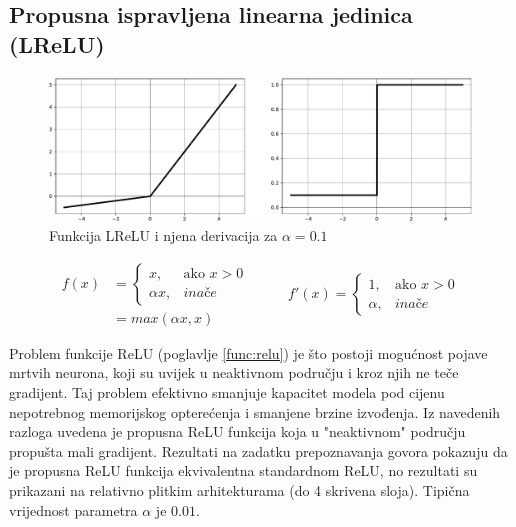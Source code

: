 \documentclass[times, utf8, numeric, diplomski]{fer}
\def\otherwise{\textit{inače}}
\def\secref#1{(poglavlje \ref{#1})}
\begin{document}
\subsection{Propusna ispravljena linearna jedinica (LReLU)}

\begin{figure}[H]
\includegraphics[width=\textwidth]{func_LReLU.pdf}
\centering
\caption{Funkcija LReLU i njena derivacija za $\alpha=0.1$}
\label{fig:lrelu}
\end{figure}

\begin{equation}
\label{eq:lrelu}
\begin{split}
f(x) &= \begin{cases}
x,			& \text{ako } x > 0 \\
\alpha x,	& \otherwise
\end{cases} \\
&= max(\alpha x, x)
\end{split}
\qquad
\begin{split}
f'(x) = 
\begin{cases}
1,		& \text{ako } x > 0 \\
\alpha,	& \otherwise
\end{cases}
\end{split}
\end{equation}

Problem funkcije ReLU \secref{func:relu} je što postoji mogućnost pojave mrtvih neurona, koji su uvijek u neaktivnom području i kroz njih ne teče gradijent. Taj problem efektivno smanjuje kapacitet modela pod cijenu nepotrebnog memorijskog opterećenja i smanjene brzine izvođenja. Iz navedenih razloga uvedena je propusna ReLU funkcija koja u "neaktivnom" području propušta mali gradijent. Rezultati na zadatku prepoznavanja govora pokazuju da je propusna ReLU funkcija ekvivalentna standardnom ReLU, no rezultati su prikazani na relativno plitkim arhitekturama (do 4 skrivena sloja). Tipična vrijednost parametra $\alpha$ je $0.01$. \citep{lrelu}

\iffalse %
\end{document}
